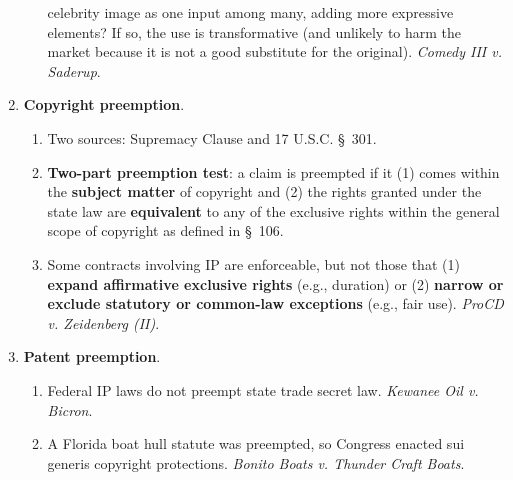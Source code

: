 \begin{enumerate}
\begin{enumerate}
        celebrity image as one input among many, adding more expressive 
        elements? If so, the use is transformative (and unlikely to harm the 
        market because it is not a good substitute for the original). 
        \emph{Comedy III v. Saderup}.
    \end{enumerate}
    \item \textbf{Copyright preemption}.
    \begin{enumerate}
        \item Two sources: Supremacy Clause and 17 U.S.C. \S\ 301.
        \item \textbf{Two-part preemption test}: a claim is preempted if it 
        (1) comes within the \textbf{subject matter} of copyright and (2) the 
        rights granted under the state law are \textbf{equivalent} to any of 
        the exclusive rights within the general scope of copyright as defined 
        in \S\ 106.
        \item Some contracts involving IP are enforceable, but not those that 
        (1) \textbf{expand affirmative exclusive rights} (e.g., duration) or 
        (2) \textbf{narrow or exclude statutory or common-law exceptions} 
        (e.g., fair use). \emph{ProCD v. Zeidenberg (II)}.
    \end{enumerate}
    \item \textbf{Patent preemption}.
    \begin{enumerate}
        \item Federal IP laws do not preempt state trade secret law. 
        \emph{Kewanee Oil v. Bicron}.
        \item A Florida boat hull statute was preempted, so Congress enacted 
        sui generis copyright protections. \emph{Bonito Boats v. Thunder Craft 
        Boats}.
    \end{enumerate}
\end{enumerate}
